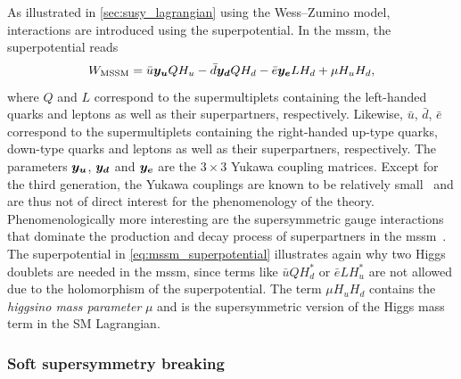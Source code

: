 As illustrated in \cref{sec:susy_lagrangian} using the Wess--Zumino model, interactions are introduced using the superpotential. In the \gls{mssm}, the superpotential reads
\begin{equation}
	W_\mathrm{MSSM} = \bar{u}\makemebold{y_u}QH_u - \bar{d}\makemebold{y_d}QH_d - \bar{e}\makemebold{y_e}LH_d + \mu H_uH_d,
	\label{eq:mssm_superpotential}
\end{equation}
where $Q$ and $L$ correspond to the supermultiplets containing the left-handed quarks and leptons as well as their superpartners, respectively. Likewise, $\bar{u}$, $\bar{d}$, $\bar{e}$ correspond to the supermultiplets containing the right-handed up-type quarks, down-type quarks and leptons as well as their superpartners, respectively. The parameters $\makemebold{y_u}$, $\makemebold{y_d}$ and $\makemebold{y_e}$ are the $3\times 3$ Yukawa coupling matrices. Except for the third generation, the Yukawa couplings are known to be relatively small~\cite{Martin:1997ns} and are thus not of direct interest for the phenomenology of the theory. Phenomenologically more interesting are the supersymmetric gauge interactions that dominate the production and decay process of superpartners in the \gls{mssm}~\cite{Martin:1997ns}. The superpotential in \cref{eq:mssm_superpotential} illustrates again why two Higgs doublets are needed in the \gls{mssm}, since terms like $\bar{u}QH_d^*$ or $\bar{e}LH_u^*$ are not allowed due to the holomorphism of the superpotential. The term $\mu H_u H_d$ contains the \textit{higgsino mass parameter} $\mu$ and is the supersymmetric version of the Higgs mass term in the SM Lagrangian.


\subsubsection{Soft supersymmetry breaking}\label{sec:susy_breaking}


